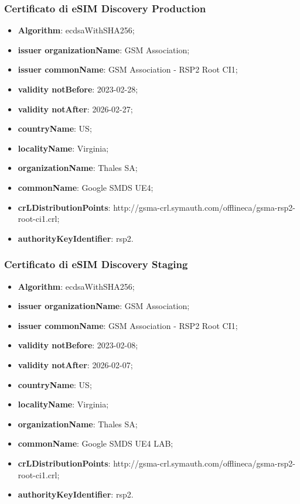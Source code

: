 \documentclass[10pt, oneside]{book}
\begin{document}
\subsubsection{Certificato di eSIM Discovery Production}
\begin{itemize}
\item \textbf{Algorithm}: ecdsaWithSHA256;
\item \textbf{issuer organizationName}: GSM Association;
\item \textbf{issuer commonName}: GSM Association - RSP2 Root CI1;
\item \textbf{validity notBefore}: 2023-02-28;
\item \textbf{validity notAfter}: 2026-02-27;
\item \textbf{countryName}: US;
\item \textbf{localityName}: Virginia;
\item \textbf{organizationName}: Thales SA;
\item \textbf{commonName}: Google SMDS UE4;
\item \textbf{crLDistributionPoints}: http://gsma-crl.symauth.com/offlineca/gsma-rsp2-root-ci1.crl;
\item \textbf{authorityKeyIdentifier}: rsp2.
\end{itemize}

\subsubsection{Certificato di eSIM Discovery Staging}
\begin{itemize}
\item \textbf{Algorithm}: ecdsaWithSHA256;
\item \textbf{issuer organizationName}: GSM Association;
\item \textbf{issuer commonName}: GSM Association - RSP2 Root CI1;
\item \textbf{validity notBefore}: 2023-02-08;
\item \textbf{validity notAfter}: 2026-02-07;
\item \textbf{countryName}: US;
\item \textbf{localityName}: Virginia;
\item \textbf{organizationName}: Thales SA;
\item \textbf{commonName}: Google SMDS UE4 LAB;
\item \textbf{crLDistributionPoints}: http://gsma-crl.symauth.com/offlineca/gsma-rsp2-root-ci1.crl;
\item \textbf{authorityKeyIdentifier}: rsp2.
\end{itemize}
\end{document}

